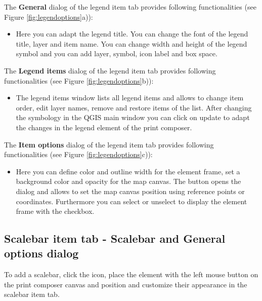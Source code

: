 
The \textbf{General} dialog of the legend item tab provides following
functionalities (see Figure \ref{fig:legendoptions}a)):

\begin{itemize}[label=--]
\item Here you can adapt the legend title. You can change the font of the
legend title, layer and item name. You can change width and height of the
legend symbol and you can add layer, symbol, icon label and box space.
\end{itemize}


The \textbf{Legend items} dialog of the legend item tab provides following
functionalities (see Figure \ref{fig:legendoptions}b)):

\begin{itemize}[label=--]
\item The legend items window lists all legend items and allows to change
item order, edit layer names, remove and restore items of the list. After
changing the symbology in the QGIS main window you can click on update to
adapt the changes in the legend element of the print composer.
\end{itemize}


The \textbf{Item options} dialog of the legend item tab provides following
functionalities (see Figure \ref{fig:legendoptions}c)):

\begin{itemize}[label=--]
\item Here you can define color and outline width for the element frame, set
a background color and opacity for the map canvas. The 
button opens the  dialog and allows to set the map
canvas position using reference points or coordinates. Furthermore you can
select or unselect to display the element frame with the  checkbox.
\end{itemize}

\subsection{Scalebar item tab - Scalebar and General options dialog}

To add a scalebar, click the 
icon, place the element with the left mouse button on the print composer
canvas and position and customize their appearance in the scalebar item tab.

